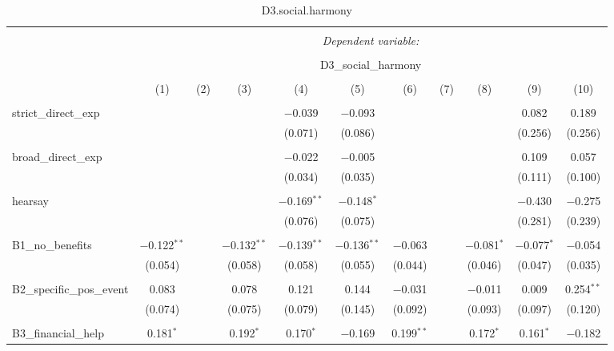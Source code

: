 
\begin{table}[H] \centering 
  \caption{D3.social.harmony} 
  \label{} 
\tiny 
\begin{tabular}{@{\extracolsep{4pt}}lcccccccccc} 
\\[-1.8ex]\hline 
\hline \\[-1.8ex] 
 & \multicolumn{10}{c}{\textit{Dependent variable:}} \\ 
\cline{2-11} 
\\[-1.8ex] & \multicolumn{10}{c}{D3\_social\_harmony} \\ 
\\[-1.8ex] & (1) & (2) & (3) & (4) & (5) & (6) & (7) & (8) & (9) & (10)\\ 
\hline \\[-1.8ex] 
 strict\_direct\_exp &  &  &  & $-$0.039 & $-$0.093 &  &  &  & 0.082 & 0.189 \\ 
  &  &  &  & (0.071) & (0.086) &  &  &  & (0.256) & (0.256) \\ 
  & & & & & & & & & & \\ 
 broad\_direct\_exp &  &  &  & $-$0.022 & $-$0.005 &  &  &  & 0.109 & 0.057 \\ 
  &  &  &  & (0.034) & (0.035) &  &  &  & (0.111) & (0.100) \\ 
  & & & & & & & & & & \\ 
 hearsay &  &  &  & $-$0.169$^{**}$ & $-$0.148$^{*}$ &  &  &  & $-$0.430 & $-$0.275 \\ 
  &  &  &  & (0.076) & (0.075) &  &  &  & (0.281) & (0.239) \\ 
  & & & & & & & & & & \\ 
 B1\_no\_benefits & $-$0.122$^{**}$ &  & $-$0.132$^{**}$ & $-$0.139$^{**}$ & $-$0.136$^{**}$ & $-$0.063 &  & $-$0.081$^{*}$ & $-$0.077$^{*}$ & $-$0.054 \\ 
  & (0.054) &  & (0.058) & (0.058) & (0.055) & (0.044) &  & (0.046) & (0.047) & (0.035) \\ 
  & & & & & & & & & & \\ 
 B2\_specific\_pos\_event & 0.083 &  & 0.078 & 0.121 & 0.144 & $-$0.031 &  & $-$0.011 & 0.009 & 0.254$^{**}$ \\ 
  & (0.074) &  & (0.075) & (0.079) & (0.145) & (0.092) &  & (0.093) & (0.097) & (0.120) \\ 
  & & & & & & & & & & \\ 
 B3\_financial\_help & 0.181$^{*}$ &  & 0.192$^{*}$ & 0.170$^{*}$ & $-$0.169 & 0.199$^{**}$ &  & 0.172$^{*}$ & 0.161$^{*}$ & $-$0.182 \\ 

\end{tabular}
\end{table}
